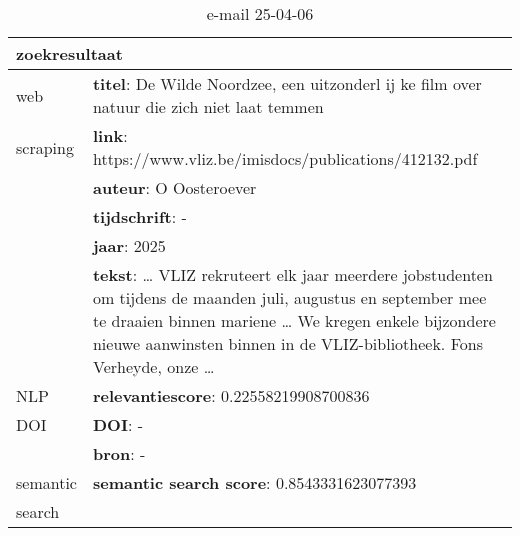 \begin{table}[h!]
    \caption{e-mail 25-04-06}
    \centering
    \begin{tabularx}{\textwidth}{|p{4cm}|X|} 
        \hline
        \multicolumn{2}{|X|}{\textbf{zoekresultaat}} \\
        \hline
        web &\textbf{titel}: De Wilde Noordzee, een uitzonderl ij ke film over natuur die zich niet laat temmen\\
        scraping&\textbf{link}: https://www.vliz.be/imisdocs/publications/412132.pdf\\
        &\textbf{auteur}: O Oosteroever\\
        &\textbf{tijdschrift}: -\\
        &\textbf{jaar}: 2025\\
        &\textbf{tekst}: … VLIZ rekruteert elk jaar meerdere jobstudenten om tijdens de maanden juli, augustus en september mee te draaien binnen mariene … We kregen enkele bijzondere nieuwe aanwinsten binnen in de VLIZ-bibliotheek. Fons Verheyde, onze …\\
        \hline
        NLP&\textbf{relevantiescore}: 0.22558219908700836\\
        \hline
        DOI&\textbf{DOI}: -\\
        &\textbf{bron}: -\\
        \hline
        semantic&\textbf{semantic search score}: 0.8543331623077393\\
        search&\\
        \hline
    \end{tabularx}
    \label{table:email20250406}
\end{table}
